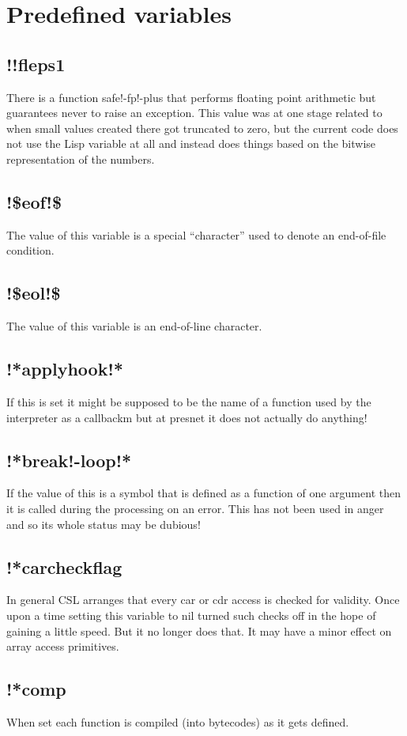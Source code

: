 \documentclass[a4paper,11pt]{article}
\begin{document}
\section{Predefined variables}

\subsection{\ttfamily !!fleps1}
There is a function safe!-fp!-plus that performs floating point
arithmetic but guarantees never to raise an exception. This value was
at one stage related to when small values created there got truncated to zero,
but the current code does not use the Lisp variable at all and instead does
things based on the bitwise representation of the numbers.
\subsection{\ttfamily !\$eof!\$}
The value of this variable is a special ``character'' used to denote an
end-of-file condition.

\subsection{\ttfamily !\$eol!\$}
The value of this variable is an end-of-line character.
\subsection{\ttfamily !*applyhook!*}
If this is set it might be supposed to be the name of a function used
by the interpreter as a callbackm but at presnet it does not actually do
anything!
\subsection{\ttfamily !*break!-loop!*}
If the value of this is a symbol that is defined as a function of one
argument then it is called during the processing on an error. This has not
been used in anger and so its whole status may be dubious!
\subsection{\ttfamily !*carcheckflag}
In general CSL arranges that every {\ttfamily car} or {\ttfamily cdr} access
is checked for validity. Once upon a time setting this variable to nil
turned such checks off in the hope of gaining a little speed. But it no
longer does that. It may have a minor effect on array access primitives.
\subsection{\ttfamily !*comp}
When set each function is compiled (into bytecodes) as it gets defined.
\end{document}
